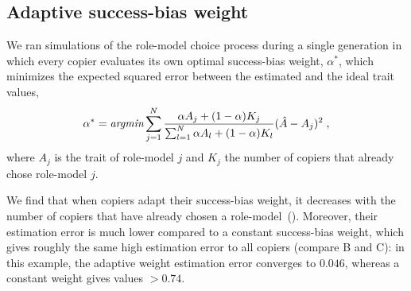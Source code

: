 \documentclass[12pt]{extarticle}
\begin{document}
\subsection*{Adaptive success-bias weight}

We ran simulations of the role-model choice process during a single generation in which every copier evaluates its own optimal success-bias weight, $\alpha^*$, which minimizes the expected squared error between the estimated and the ideal trait values,
\begin{equation}
\alpha^* = \emph{argmin} \sum_{j=1}^N\frac{\alpha A_j + (1-\alpha) K_j}{\sum_{l=1}^N\alpha A_l + (1-\alpha) K_l} (\hat{A}-A_j)^2 \;,
\end{equation}
where $A_j$ is the trait of role-model $j$ and $K_j$ the number of copiers that already chose role-model $j$.

We find that when copiers adapt their success-bias weight, it decreases with the number of copiers that have already chosen a role-model~().
Moreover, their estimation error is much lower compared to a constant success-bias weight, which gives roughly the same high estimation error to all copiers (compare B and C): in this example, the adaptive weight estimation error converges to $0.046$, whereas a constant weight gives values $>0.74$.
\end{document}
